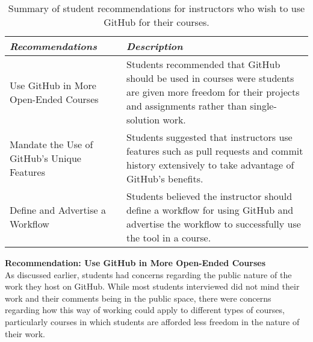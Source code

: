 \begin{table}[h]
    \vspace{1pt}
        \caption{Summary of student recommendations for instructors who wish to use GitHub for their courses.}\label{table:interviews:students:recommendations}
    \vspace{1pt}
    \begin{center}
        \begin{tabular}{ | m{3cm} | m{12cm} | }
            \hline
            \emph{Recommendations} & \emph{Description} \\
            \hline
            Use GitHub in More Open-Ended Courses & Students recommended that GitHub should be used in courses were students are given more freedom for their projects and assignments rather than single-solution work. \\
            \hline
            Mandate the Use of GitHub's Unique Features & Students suggested that instructors use features such as pull requests and commit history extensively to take advantage of GitHub's benefits. \\
            \hline
            Define and Advertise a Workflow & Students believed the instructor should define a workflow for using GitHub and advertise the workflow to successfully use the tool in a course. \\
            \hline
        \end{tabular}
    \end{center}
\end{table}

\textbf{Recommendation: Use GitHub in More Open-Ended Courses} \\
As discussed earlier, students had concerns regarding the public nature of the work they host on GitHub. While most students interviewed did not mind their work and their comments being in the public space, there were concerns regarding how this way of working could apply to different types of courses, particularly courses in which students are afforded less freedom in the nature of their work. %

